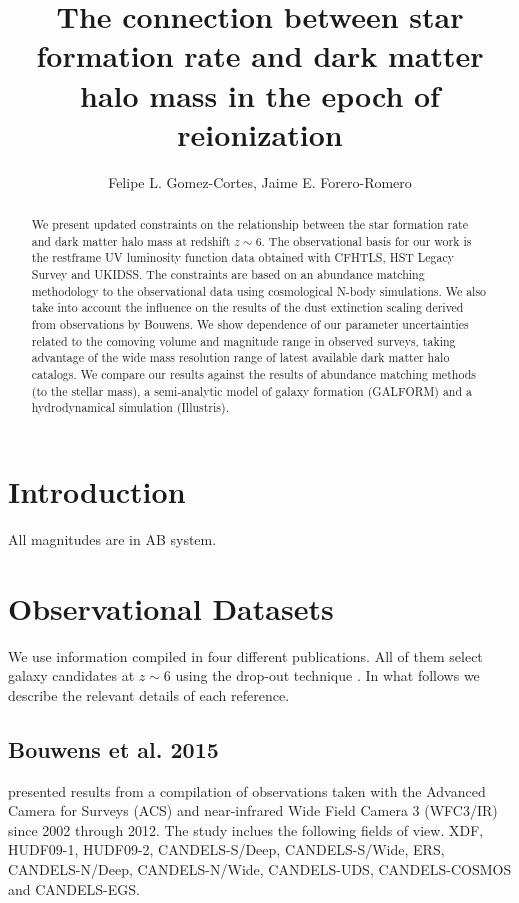 \documentclass{emulateapj}
\begin{document}
\title{The connection between star formation rate and dark matter halo
  mass in the epoch of reionization}  


\author{Felipe L. Gomez-Cortes, Jaime E. Forero-Romero}  

\begin{abstract}
We present updated constraints on the relationship between the star
formation rate and dark matter halo mass at redshift $z\sim 6$.
The observational basis for our work is the restframe UV luminosity
function data obtained with CFHTLS, HST Legacy Survey and UKIDSS.
The constraints are based on an abundance matching methodology to the
observational data using cosmological N-body simulations.
We also take into account the influence on the results of the dust extinction
scaling derived from observations by Bouwens.
We show dependence of our parameter uncertainties related to the
comoving volume and magnitude range in observed surveys, taking advantage of the 
wide mass resolution range of latest available dark matter halo catalogs.
We compare our results against the results of abundance matching
methods (to the stellar mass), a semi-analytic model of galaxy
formation (GALFORM) and a hydrodynamical simulation (Illustris).
\end{abstract}


\section{Introduction}
\label{sec:intro}


All magnitudes are in AB system.
\section{Observational Datasets}
\label{sec:theo}

We use information compiled in four different publications. 
All of them select galaxy candidates at $z\sim 6$ using the drop-out
technique \citep{Steidel96}.  
In what follows we describe the relevant details of each reference.


\subsection{Bouwens et al. 2015}
\citet{Bouwens15} presented results from a compilation of
observations taken with the Advanced Camera for Surveys (ACS) and
near-infrared Wide Field Camera 3 (WFC3/IR) since 2002 through 2012. 
The study inclues the following fields of view. XDF,
HUDF09-1, HUDF09-2, CANDELS-S/Deep,  CANDELS-S/Wide, ERS,
CANDELS-N/Deep, CANDELS-N/Wide, CANDELS-UDS,  CANDELS-COSMOS and
CANDELS-EGS.
\end{document}
